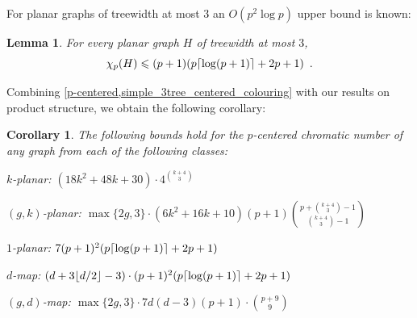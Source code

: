 \documentclass{patmorin}
\theoremstyle{plain}
\newtheorem{lem}[thm]{Lemma}
\newtheorem{cor}[thm]{Corollary}
\theoremstyle{definition}
\newcommand{\note}[2]{\noindent{\color{red}[#1:~#2]}}
\DeclarePairedDelimiter{\ceil}{\lceil}{\rceil}
\DeclarePairedDelimiter{\floor}{\lfloor}{\rfloor}
\renewcommand{\ge}{\geqslant}
\renewcommand{\le}{\leqslant}
\begin{document}
% 

For planar graphs of treewidth at most $3$ an $O(p^2\log p)$ upper bound is known:

\begin{lem}\cite{DFMS21}\label{simple_3tree_centered_colouring}
  For every planar graph $H$ of treewidth at most $3$, 
  \[ 
    \chi_p(H)\le (p+1)(p\ceil{\log(p+1)}+2p+1) \enspace .
  \]
\end{lem}

Combining \cref{p-centered,simple_3tree_centered_colouring} with our results on product structure, we obtain the following corollary:

\begin{cor}\label{p_centered_cor}
  The following bounds hold for the $p$-centered chromatic number of any graph from each of the following classes:
  \begin{compactenum}
    \item $k$-planar: $(18k^2+48k+30)\cdot 4^{\binom{k+4}{3}}$
    \item $(g,k)$-planar: $\max\{2g,3\}\cdot(6k^2+16k+10)(p+1)\binom{p+\binom{k+4}{3}-1}{\binom{k+4}{3}-1}$
    \item $1$-planar: $7(p+1)^2(p\ceil{\log(p+1)}+2p+1)$
    \item $d$-map: $(d+3\floor{d/2}-3)\cdot (p+1)^2(p\ceil{\log(p+1)}+2p+1)$
    \item $(g,d)$-map: $\max\{2g,3\}\cdot 7d(d-3)(p+1)\cdot \binom{p+9}{9}$
  \end{compactenum}
\end{cor}
\end{document}
